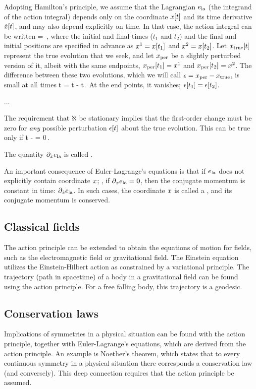 Adopting Hamilton's principle, we assume that the Lagrangian $e_\text{la}$ (the integrand of the action integral) depends only on the coordinate $x\!\left[{t}\right]$ and its time derivative $\dot{x}\!\left[{t}\right]$, and may also depend explicitly on time. In that case, the action integral can be written
%
\beq
  \action = \,,
\eeq
%
where the initial and final times ($t_1$ and $t_2$) and the final and initial positions are specified in advance as ${x}^{1} = x\!\left[{t_1}\right]$ and ${x}^{2} = x\!\left[{t_2}\right]$. Let $x_\text{true}\!\left[{t}\right]$ represent the true evolution that we seek, and let $x_\text{per}$ be a slightly perturbed version of it, albeit with the same endpoints, $x_\text{per}\!\left[{t_1}\right] = {x}^{1}$ and $x_\text{per}\!\left[{t_2}\right] = {x}^{2}$. The difference between these two evolutions, which we will call $\epsilon = x_\text{per} - x_\text{true}$, is small at all times
%
\beq
  \vpos\vat t = \xpos{}\vat t - \xpos{}\vat t\,.
\eeq
%
At the end points, it vanishes; \viz $\epsilon\!\left[{t_1}\right] = \epsilon\!\left[{t_2}\right]$.

...

The requirement that $\aleph$ be stationary implies that the first-order change must be zero for \emph{any} possible perturbation $\epsilon\!\left[{t}\right]$ about the true evolution. This can be true only if
%
\beq
  \iod t\parth{\ipd{\dt\xpos}\elag} - \ipd{\xpos}\elag = 0\,.
\eeq

The quantity $\partial_{\dot{x}}e_\text{la}$ is called . 

An important consequence of Euler-Lagrange's equations is that if $e_\text{la}$ does not explicitly contain coordinate $x$; \ie, if $\partial_{x}e_\text{la} = 0$, then the conjugate momentum is constant in time: $\partial_{\dot{x}}e_\text{la}$. In such cases, the coordinate $x$ is called a , and its conjugate momentum is conserved.


\subsection{Classical fields}
%
The action principle can be extended to obtain the equations of motion for fields, such as the electromagnetic field or gravitational field. The Einstein equation utilizes the Einstein-Hilbert action as constrained by a variational principle. The trajectory (path in spacetime) of a body in a gravitational field can be found using the action principle. For a free falling body, this trajectory is a geodesic.


\subsection{Conservation laws}
%
Implications of symmetries in a physical situation can be found with the action principle, together with Euler-Lagrange's equations, which are derived from the action principle. An example is Noether's theorem, which states that to every continuous symmetry in a physical situation there corresponds a conservation law (and conversely). This deep connection requires that the action principle be assumed.
